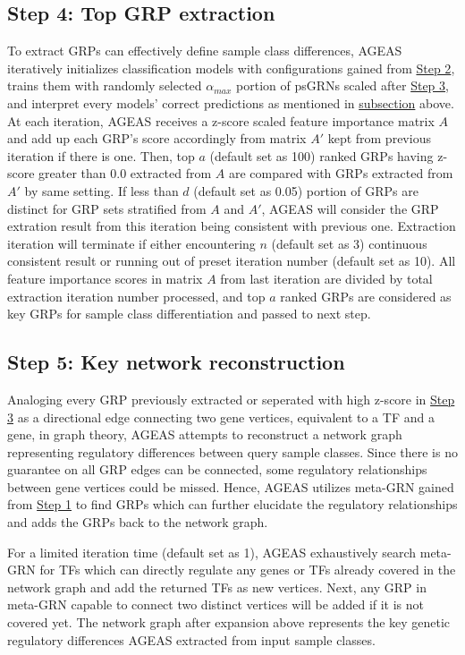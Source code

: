 \documentclass[fleqn,10pt]{wlscirep}
\begin{document}
  \subsection*{Step 4: Top GRP extraction}
    \label{step4}
    To extract GRPs can effectively define sample class differences, AGEAS iteratively initializes classification models with configurations gained from \hyperref[step2]{Step 2}, trains them with randomly selected $\alpha_{max}$ portion of psGRNs scaled after \hyperref[step3]{Step 3}, and interpret every models' correct predictions as mentioned in \hyperref[features_importances]{subsection} above.
    At each iteration, AGEAS receives a z-score scaled feature importance matrix $A$ and add up each GRP's score accordingly from matrix $A'$ kept from previous iteration if there is one.
    Then, top $a$ (default set as 100) ranked GRPs having z-score greater than $0.0$ extracted from $A$ are compared with GRPs extracted from $A'$ by same setting.
    If less than $d$ (default set as 0.05) portion of GRPs are distinct for GRP sets stratified from $A$ and $A'$, AGEAS will consider the GRP extration result from this iteration being consistent with previous one.
    Extraction iteration will terminate if either encountering $n$ (default set as 3) continuous consistent result or running out of preset iteration number (default set as 10).
    All feature importance scores in matrix $A$ from last iteration are divided by total extraction iteration number processed, and top $a$ ranked GRPs are considered as key GRPs for sample class differentiation and passed to next step.

  \subsection*{Step 5: Key network reconstruction}
    \label{step5}
    Analoging every GRP previously extracted or seperated with high z-score in \hyperref[step3]{Step 3} as a directional edge connecting two gene vertices, equivalent to a TF and a gene, in graph theory, AGEAS attempts to reconstruct a network graph representing regulatory differences between query sample classes.
    Since there is no guarantee on all GRP edges can be connected, some regulatory relationships between gene vertices could be missed.
    Hence, AGEAS utilizes meta-GRN gained from \hyperref[step1]{Step 1} to find GRPs which can further elucidate the regulatory relationships and adds the GRPs back to the network graph.

    For a limited iteration time (default set as  1), AGEAS exhaustively search meta-GRN for TFs which can directly regulate any genes or TFs already covered in the network graph and add the returned TFs as new vertices.
    Next, any GRP in meta-GRN capable to connect two distinct vertices will be added if it is not covered yet.
    The network graph after expansion above represents the key genetic regulatory differences AGEAS extracted from input sample classes.
\end{document}
